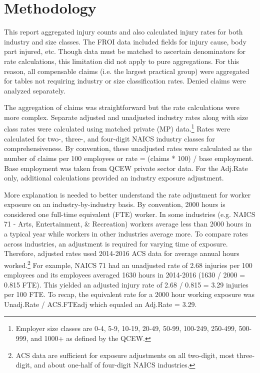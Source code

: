 \documentclass[9pt, oneside]{article}   	%
\begin{document}
\section{Methodology}

This report aggregated injury counts and also calculated injury rates for both industry and size classes. The FROI data included fields for injury cause, body part injured, etc. Though data must be matched to ascertain denominators for rate calculations, this limitation did not apply to pure aggregations. For this reason, all compensable claims (i.e. the largest practical group) were aggregated for tables not requiring industry or size classification rates. Denied claims were analyzed separately. 

The aggregation of claims was straightforward but the rate calculations were more complex. Separate adjusted and unadjusted industry rates along with size class rates were calculated using matched private (MP) data.\footnote{Employer size classes are 0-4, 5-9, 10-19, 20-49, 50-99, 100-249, 250-499, 500-999,  and 1000+ as defined by the QCEW.}  Rates were calculated for two-, three-, and four-digit NAICS industry classes for comprehensiveness. By convention, these unadjusted rates were calculated as the number of claims per 100 employees or rate = (claims  * 100) / base employment.  Base employment was taken from QCEW private sector data. For the Adj.Rate only, additional calculations provided an industry exposure adjustment. 

More explanation is needed to better understand the rate adjustment for worker exposure on an industry-by-industry basis. By convention, 2000 hours is considered one full-time equivalent (FTE) worker. In some industries (e.g. NAICS 71 - Arts, Entertainment, & Recreation) workers average less than 2000 hours in a typical year while workers in other industries average more. To compare rates across industries, an adjustment is required for varying time of exposure. Therefore, adjusted rates used 2014-2016 ACS data for average annual hours worked.\footnote{ACS data are sufficient for exposure adjustments on all two-digit, most three-digit, and about one-half of four-digit NAICS industries.}  For example, NAICS 71 had an unadjusted rate of 2.68 injuries per 100 employees and its employees averaged 1630 hours in 2014-2016 (1630 / 2000 = 0.815 FTE). This yielded an adjusted injury rate of 2.68 / 0.815 = 3.29 injuries per 100 FTE.   To recap, the equivalent rate for a 2000 hour working exposure was Unadj.Rate / ACS.FTEadj which equaled an Adj.Rate = 3.29.
\end{document}
